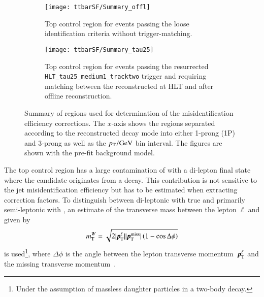 \begin{figure}[htbp]
  \centering

  \begin{subfigure}[t]{.485\textwidth}
    \texttt{[image: ttbarSF/Summary\_offl]}
    \caption{Top control region for events passing the loose
      \tauhadvis identification criteria without trigger-matching.}
  \end{subfigure}\hfill%
  \begin{subfigure}[t]{.485\textwidth}
    \texttt{[image: ttbarSF/Summary\_tau25]}
    \caption{Top control region for events passing the resurrected
      \texttt{HLT\_tau25\_medium1\_tracktwo} trigger and requiring
      matching between the reconstructed \tauhadvis at HLT and after
      offline \tauhadvis reconstruction.}
  \end{subfigure}

  \caption{Summary of regions used for determination of the \tauhadvis
    misidentification efficiency corrections. The $x$-axis shows the
    regions separated according to the reconstructed decay mode into
    either 1-prong (1P) and 3-prong \tauhadvis as well as the
    \tauhadvis $\pT /\si{\GeV}$ bin interval. The figures are shown
    with the pre-fit background model.}
  \label{fig:ttbarsf_region_summary_prefit}
\end{figure}

The top control region has a large contamination of \ttbar with a
di-lepton final state where the \tauhadvis candidate originates from a
\tauhad decay. This contribution is not sensitive to the jet \ra
\tauhadvis misidentification efficiency but has to be estimated when
extracting correction factors. To distinguish between di-leptonic
\ttbar with true \tauhadvis and primarily semi-leptonic \ttbar with
\faketauhadvis, an estimate of the transverse mass between the lepton
$\ell$ and \pTmissAbs given by
\begin{align*}
  \mTW = \sqrt{2 | \myvec{p}_{\text{T}}^{\ell} | | \pTmiss | \left( 1 - \cos \Delta\phi \right)}
\end{align*}
is used\footnote{Under the assumption of massless daughter particles
  in a two-body decay.}, where $\Delta \phi$ is the angle between the
lepton transverse momentum~$\myvec{p}_{\text{T}}^{\ell}$ and the
missing transverse momentum~\pTmiss.

